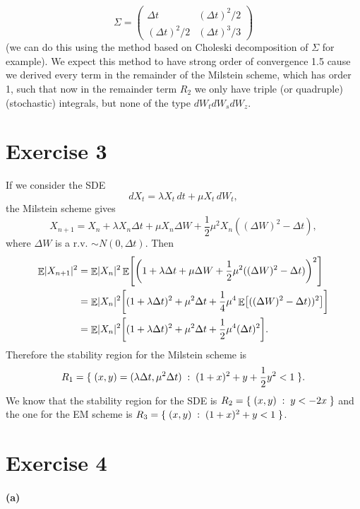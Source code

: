 \documentclass[a4paper,11pt]{article}
\theoremstyle{definition}
\theoremstyle{plain}
\theoremstyle{remark}
\DeclarePairedDelimiter{\abs}{\lvert}{\rvert}
\DeclarePairedDelimiter{\parr}{(}{)}
\DeclarePairedDelimiter{\parq}{[}{]}
\DeclarePairedDelimiter{\bra}{\lbrace}{\rbrace}
\DeclareMathOperator*{\expval}{\mathbb{E}}
\begin{document}
$$
\Sigma = \left(\begin{matrix}
\Delta t & (\Delta t)^2/2 \\ (\Delta t)^2/2 & (\Delta t)^3/3
\end{matrix}\right)
$$
(we can do this using the method based on Choleski decomposition of $\Sigma$ for example). We expect this method to have strong order of convergence 1.5 cause we derived every term in the remainder of the Milstein scheme, which has order 1, such that now in the remainder term $R_2$ we only have triple (or quadruple) (stochastic) integrals, but none of the type $dW_tdW_sdW_z$.

\section*{Exercise 3}

If we consider the SDE
$$
dX_t = \lambda X_t\,dt + \mu X_t\,dW_t,
$$
the Milstein scheme gives
$$
X_{n+1} = X_n + \lambda X_n \Delta t + \mu X_n\Delta W + \frac{1}{2}\mu^2 X_n ((\Delta W)^2-\Delta t),
$$
where $\Delta W$ is a r.v. $\sim N(0,\Delta t)$. Then
\begin{align*}
\expval\abs{X_{n+1}}^2 & = \expval\abs{X_n}^2\expval\parq*{\parr*{1+\lambda\Delta t+\mu\Delta W + \frac{1}{2}\mu^2((\Delta W)^2-\Delta t)}^2} \\ & = \expval\abs{X_n}^2\parq*{(1+\lambda \Delta t)^2 + \mu^2\Delta t + \frac{1}{4}\mu^4\expval\parq*{((\Delta W)^2-\Delta t))^2}} \\ & = \expval\abs{X_n}^2\parq*{(1+\lambda \Delta t)^2 + \mu^2\Delta t + \frac{1}{2}\mu^4(\Delta t)^2}.
\end{align*}
Therefore the stability region for the Milstein scheme is
$$
R_1 = \bra{\;(x,y) = (\lambda\Delta t,\mu^2\Delta t)\;:\;(1+x)^2 + y + \frac{1}{2}y^2 < 1\;}.
$$
We know that the stability region for the SDE is $R_2 = \bra{\;(x,y)\;:\;y<-2x\;}$ and the one for the EM scheme is $R_3 = \bra{\;(x,y)\;:\;(1+x)^2 + y < 1\;}$.

\section*{Exercise 4}

\paragraph*{(a)}
\end{document}
